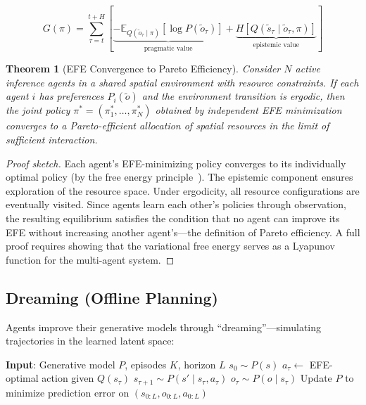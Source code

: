 \documentclass[11pt,letterpaper]{article}
\newtheorem{theorem}{Theorem}[section]
\newcommand{\E}{\mathbb{E}}
\begin{document}
\begin{equation}
G(\pi) = \sum_{\tau=t}^{t+H} \left[ \underbrace{-\E_{Q(\tilde{o}_\tau \mid \pi)}[\log P(\tilde{o}_\tau)]}_{\text{pragmatic value}} + \underbrace{H[Q(\tilde{s}_\tau \mid \tilde{o}_\tau, \pi)]}_{\text{epistemic value}} \right]
\label{eq:efe_spatial}
\end{equation}

\begin{theorem}[EFE Convergence to Pareto Efficiency]
\label{thm:pareto}
Consider $N$ active inference agents in a shared spatial environment with resource constraints. If each agent $i$ has preferences $P_i(\tilde{o})$ and the environment transition is ergodic, then the joint policy $\pi^* = (\pi_1^*, \ldots, \pi_N^*)$ obtained by independent EFE minimization converges to a Pareto-efficient allocation of spatial resources in the limit of sufficient interaction.
\end{theorem}

\begin{proof}[Proof sketch]
Each agent's EFE-minimizing policy converges to its individually optimal policy (by the free energy principle~\cite{friston2010free}). The epistemic component ensures exploration of the resource space. Under ergodicity, all resource configurations are eventually visited. Since agents learn each other's policies through observation, the resulting equilibrium satisfies the condition that no agent can improve its EFE without increasing another agent's---the definition of Pareto efficiency. A full proof requires showing that the variational free energy serves as a Lyapunov function for the multi-agent system.
\end{proof}

\subsection{Dreaming (Offline Planning)}

Agents improve their generative models through ``dreaming''---simulating trajectories in the learned latent space:

\begin{algorithm}[t]
\caption{Agent Dreaming}
\label{alg:dream}
\begin{algorithmic}[1]
\STATE \textbf{Input}: Generative model $P$, episodes $K$, horizon $L$
    \STATE $s_0 \sim P(s)$ 
        \STATE $a_\tau \leftarrow$ EFE-optimal action given $Q(s_\tau)$
        \STATE $s_{\tau+1} \sim P(s' \mid s_\tau, a_\tau)$
        \STATE $o_\tau \sim P(o \mid s_\tau)$
    \ENDFOR
    \STATE Update $P$ to minimize prediction error on $(s_{0:L}, o_{0:L}, a_{0:L})$
\ENDFOR
\end{algorithmic}
\end{algorithm}
\end{document}
